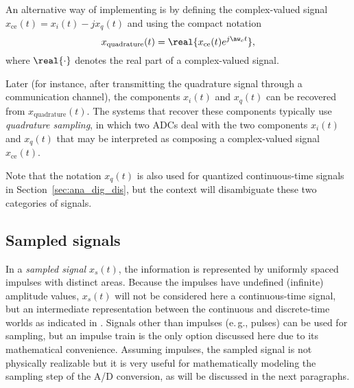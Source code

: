 An alternative way of implementing  is by defining the complex-valued
signal $x_{\textrm{ce}}(t) = x_i(t) - j x_q(t)$ and using the compact notation
\begin{equation}
x_{\textrm{quadrature}}(t) = \real{ x_{\textrm{ce}}(t) e^{j \aw_c t} },
\end{equation}
where $\real{\cdot}$ denotes the real part of a complex-valued signal.

Later (for instance, after transmitting the quadrature signal through a communication channel), the components $x_i(t)$ and $x_q(t)$ can be recovered from $x_{\textrm{quadrature}}(t)$. The systems that recover these components typically use \emph{quadrature sampling}, in which two ADCs deal with the two components $x_i(t)$ and $x_q(t)$ that may be interpreted as composing a complex-valued signal $x_{\textrm{ce}}(t)$.

Note that the notation $x_q(t)$ is also used for quantized continuous-time signals in Section~\ref{sec:ana_dig_dis},
but the context will disambiguate these two categories of signals.


\subsection{Sampled signals}

In a \emph{sampled signal } $x_s(t)$, the information is represented by uniformly spaced impulses with distinct areas. Because the impulses have undefined (infinite) amplitude values, $x_s(t)$ will not be considered here a continuous-time signal, but an intermediate representation between the continuous and discrete-time worlds as indicated in .
Signals other than impulses (e.\,g., pulses) can be used for sampling, but an impulse train is the only option discussed here due to its mathematical convenience.
 Assuming impulses, the sampled signal is not physically realizable but it is very useful for mathematically modeling the sampling step of the A/D conversion, as will be discussed in the next paragraphs.

